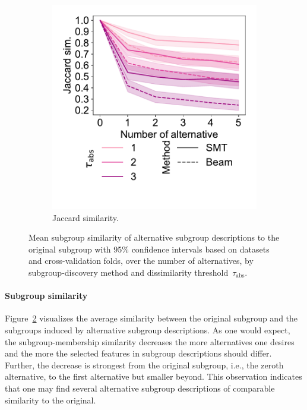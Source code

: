 \documentclass{article}
\theoremstyle{definition}
\begin{document}
\begin{figure}[t]
\begin{subfigure}[t]{0.48\textwidth}
		\includegraphics[width=\textwidth, trim=15 50 15 15, clip]{plots/csd-alternatives-jaccard.pdf}
		\caption{Jaccard similarity.}
		\label{fig:csd:alternatives-jaccard}
	\end{subfigure}
	\caption{
		Mean subgroup similarity of alternative subgroup descriptions to the original subgroup with 95\% confidence intervals based on datasets and cross-validation folds, over the number of alternatives, by subgroup-discovery method and dissimilarity threshold~$\tau_{\text{abs}}$.
	}
	\label{fig:csd:alternatives-similarity}
\end{figure}

\paragraph{Subgroup similarity}

Figure~\ref{fig:csd:alternatives-similarity} visualizes the average similarity between the original subgroup and the subgroups induced by alternative subgroup descriptions.
As one would expect, the subgroup-membership similarity decreases the more alternatives one desires and the more the selected features in subgroup descriptions should differ.
Further, the decrease is strongest from the original subgroup, i.e., the zeroth alternative, to the first alternative but smaller beyond.
This observation indicates that one may find several alternative subgroup descriptions of comparable similarity to the original.
\end{document}
